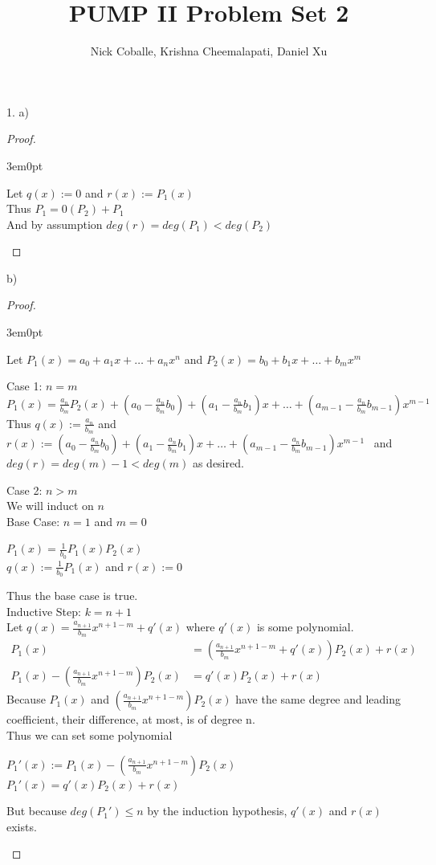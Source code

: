 \documentclass[11pt]{article}
\title{PUMP II Problem Set 2}
\author{Nick Coballe, Krishna Cheemalapati, Daniel Xu}
\newcommand{\bproof}{\begin{proof}
$ $ \\
\begin{adjustwidth}{3em}{0pt}
}
\newcommand{\eproof}{\end{adjustwidth}
\end{proof}}
\begin{document}
\maketitle

\begin{flushleft}

1. a) \bigskip

\bproof
	Let $q(x) := 0$ and $r(x) := P_1(x)$ \\
	Thus $P_1 = 0(P_2) + P_1$ \\
	And by assumption $deg(r) = deg(P_1) < deg(P_2)$
\eproof

b) \bigskip

\bproof
	Let $P_1(x) = a_0 + a_1x + \ldots + a_nx^n$ and $P_2(x) = b_0 + b_1x + \ldots + b_mx^m$ \\ \bigskip
	
	Case 1: $n = m$ \\
	$P_1(x) = \frac{a_n}{b_m}P_2(x)+(a_0- \frac{a_n}{b_m} b_0) + (a_1- \frac{a_n}{b_m} b_1)x + \ldots + (a_{m-1}- \frac{a_n}{b_m} b_{m-1})x^{m-1}$ \\
	Thus $q(x) := \frac{a_n}{b_m}$ and $r(x) := (a_0- \frac{a_n}{b_m} b_0) + (a_1- \frac{a_n}{b_m} b_1)x + \ldots + (a_{m-1}- \frac{a_n}{b_m} b_{m-1})x^{m-1}$ \
	and $deg(r) = deg(m) - 1 < deg(m)$ as desired. \\ \bigskip
	
	Case 2: $n > m$ \\
	We will induct on $n$ \\
	Base Case: $n = 1$ and $m = 0$ \\
	\begin{center}
	$P_1(x) = \frac{1}{b_0} P_1(x)P_2(x)$ \\
	$q(x) := \frac{1}{b_0} P_1(x)$ and $r(x) := 0$ \\
	\end{center}
	Thus the base case is true. \\
	Inductive Step: $k = n+1$ \\
	Let $q(x) = \frac{a_{n+1}}{b_m} x^{n+1-m} + q'(x)$ where $q'(x)$ is some polynomial.
	\begin{align*}
	P_1(x) &= (\frac{a_{n+1}}{b_m} x^{n+1-m} + q'(x))P_2(x) + r(x) \\
	P_1(x) - (\frac{a_{n+1}}{b_m} x^{n+1-m})P_2(x) &= q'(x)P_2(x) + r(x)
	\end{align*}
	Because $P_1(x)$ and $(\frac{a_{n+1}}{b_m} x^{n+1-m})P_2(x)$ have the same degree and leading coefficient, their difference, at most, is of degree n. \\
	Thus we can set some polynomial \\ 
	\begin{center}
	$P_1'(x) := P_1(x) - (\frac{a_{n+1}}{b_m} x^{n+1-m})P_2(x)$\\
	$P_1'(x) = q'(x)P_2(x) + r(x)$ \\
	\end{center}
	But because $deg(P_1') \leq n$ by the induction hypothesis, $q'(x)$ and $r(x)$ exists.
\eproof


\end{flushleft}
\end{document}
